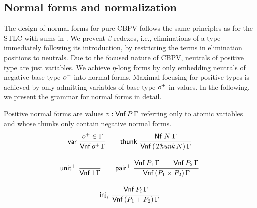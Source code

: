 \documentclass[sigplan,screen,fleqn,review]{acmart} %
\begin{document}
\subsection{Normal forms and normalization}

The design of normal forms for pure CBPV follows the same principles
as for the STLC with sums in .  We prevent
$\beta$-redexes, i.e., eliminations of a type immediately following
its introduction, by restricting the terms in elimination positions to
neutrals.  Due to the focused nature of CBPV, neutrals of positive
type are just variables.  We achieve $\eta$-long forms by only
embedding neutrals of negative base type $o^-$ into normal forms.
Maximal focusing for positive types is achieved by only admitting
variables of base type $o^+$ in values.
In the following, we present the
grammar for normal forms in detail.

Positive normal forms are values $v : \mathsf{Vnf}\,P\,\Gamma$
referring only to atomic variables and
whose thunks only
contain negative normal forms.
\begin{gather*}
  \nru{\tvar}{\patom \in \Gamma}{\PValNf {\patom} \Gamma}
\qquad
  \nru{\tthunk}{\Nf N \Gamma}{\PValNfP{\Thunk N}\Gamma}
\\[2ex]
  \nru{\punit}{}{\PValNf{\tyone}\Gamma}
\qquad
  \nru{\ppair}
      {\PValNf{P_1}\Gamma \qquad \PValNf{P_2}\Gamma}
      {\PValNfP{P_1 \times P_2}\Gamma}
\\[2ex]
  \nru{\tinj_i}{\PValNf{P_i}\Gamma}{\PValNfP{P_1 + P_2}\Gamma}
\end{gather*}
\end{document}
